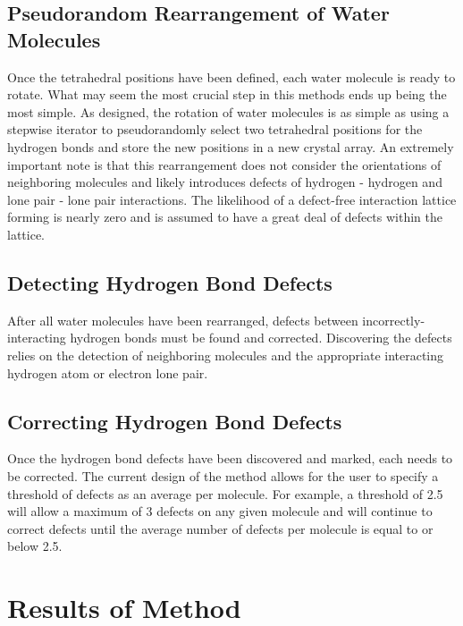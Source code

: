 \subsection{Pseudorandom Rearrangement of Water Molecules}

Once the tetrahedral positions have been defined, each water molecule is ready to rotate.
What may seem the most crucial step in this methods ends up being the most simple.
As designed, the rotation of water molecules is as simple as using a stepwise iterator to pseudorandomly select two tetrahedral positions for the hydrogen bonds and store the new positions in a new crystal array.
An extremely important note is that this rearrangement does not consider the orientations of neighboring molecules and likely introduces defects of hydrogen - hydrogen and lone pair - lone pair interactions.
The likelihood of a defect-free interaction lattice forming is nearly zero and is assumed to have a great deal of defects within the lattice. 


\subsection{Detecting Hydrogen Bond Defects}

After all water molecules have been rearranged, defects between incorrectly-interacting hydrogen bonds must be found and corrected.
Discovering the defects relies on the detection of neighboring molecules and the appropriate interacting hydrogen atom or electron lone pair. 



\subsection{Correcting Hydrogen Bond Defects}

Once the hydrogen bond defects have been discovered and marked, each needs to be corrected.
The current design of the method allows for the user to specify a threshold of defects as an average per molecule. 
For example, a threshold of 2.5 will allow a maximum of 3 defects on any given molecule and will continue to correct defects until the average number of defects per molecule is equal to or below 2.5.



\section{Results of Method}

